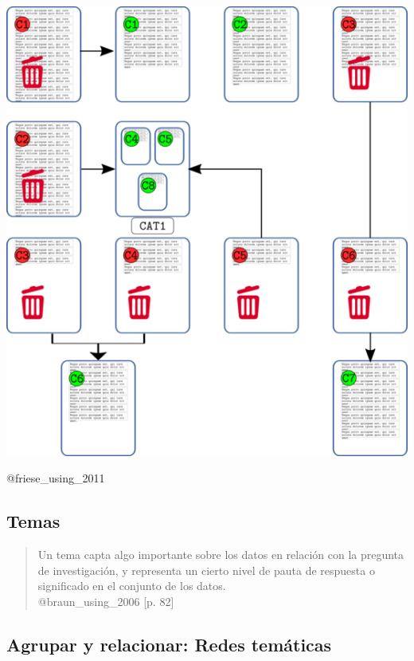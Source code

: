 \hypertarget{section-6}{%
\subsection{}\label{section-6}}

\includegraphics{imagenes-atlas-8/Categorizacion06.png}

@friese\_using\_2011

\hypertarget{temas}{%
\subsection{Temas}\label{temas}}

\begin{quote}
Un tema capta algo importante sobre los datos en relación con la
pregunta de investigación, y representa un cierto nivel de pauta de
respuesta o significado en el conjunto de los datos.\\
@braun\_using\_2006 {[}p. 82{]}
\end{quote}

\hypertarget{agrupar-relacionar}{%
\subsection{Agrupar y relacionar: Redes
temáticas}\label{agrupar-relacionar}}


